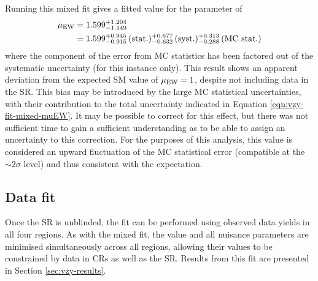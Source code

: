 Running this mixed fit gives a fitted value for the \muEW parameter of
%
\begin{equation}
  \begin{split}
  \mu_{\text{EW}} &= 1.599 ^{+1.204}_{-1.149} \\
        &= 1.599 ^{+0.945}_{-0.915} \,(\text{stat.})
                 ^{+0.677}_{-0.632} \,(\text{syst.})
                 ^{+0.313}_{-0.288} \,(\text{MC stat.})
  \end{split}
  \label{eqn:vzy-fit-mixed-muEW}
\end{equation}
%
where the component of the error from \ac{MC} statistics has been factored out
of the systematic uncertainty (for this instance only). This result shows an
apparent deviation from the expected \ac{SM} value of $\mu_{\text{EW}} = 1$, despite not
including data in the \ac{SR}. This bias may be introduced by the large \ac{MC}
statistical uncertainties, with their contribution to the total uncertainty
indicated in Equation \ref{eqn:vzy-fit-mixed-muEW}.
It may be possible to correct for this effect, but there was not sufficient time
to gain a sufficient understanding as to be able to assign an uncertainty to
this correction.
For the purposes of this analysis, this \muEW value is considered an upward
fluctuation of the \ac{MC} statistical error (compatible at the $\sim2\sigma$
level) and thus consistent with the expectation.


\subsection{Data fit}

Once the \ac{SR} is unblinded, the fit can be performed using observed data
yields in all four regions. As with the mixed fit, the \muEW value and all
nuisance parameters are minimised simultaneously across all regions, allowing
their values to be constrained by data in \acp{CR} as well as the \ac{SR}.
Results from this fit are presented in Section \ref{sec:vzy-results}.

